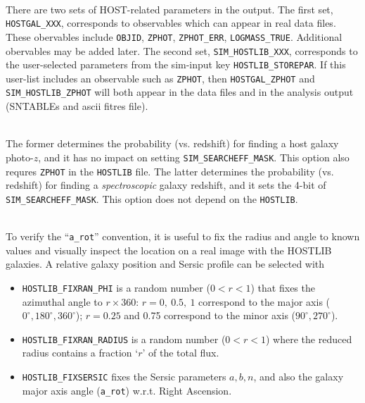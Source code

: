 \documentclass[12pt]{article}
\begin{document}
{%
\bigskip
{} \\
There are two sets of HOST-related parameters in the output.
The first set, {\tt HOSTGAL\_XXX}, corresponds to observables
which can appear in real data files. These obervables include
{\tt OBJID}, {\tt ZPHOT}, {\tt ZPHOT\_ERR}, {\tt LOGMASS\_TRUE}.
Additional obervables may be added later.  The second set,
{\tt SIM\_HOSTLIB\_XXX}, corresponds to the user-selected
parameters from the sim-input key {\tt HOSTLIB\_STOREPAR}.
If this user-list includes an observable such as {\tt ZPHOT},
then {\tt HOSTGAL\_ZPHOT} and {\tt SIM\_HOSTLIB\_ZPHOT} 
will both appear in the data files and in the 
analysis output (SNTABLEs and ascii fitres file).


\bigskip 
{}\\
The former determines the probability (vs. redshift) for finding
a host galaxy photo-$z$, and it has no impact on setting
{\tt SIM\_SEARCHEFF\_MASK}. This option also requres {\tt ZPHOT} 
in the {\tt HOSTLIB} file.
The latter determines the probability (vs. redshift) for finding
a {\it spectroscopic} galaxy redshift, and it sets the 4-bit of
{\tt SIM\_SEARCHEFF\_MASK}. This option does not depend on the
{\tt HOSTLIB}.



\bigskip
{} \\
To verify the ``{\tt a\_rot}'' convention, it is useful to fix the
radius and angle to known values and visually inspect the location
on a real image with the HOSTLIB galaxies. A relative
galaxy position and Sersic profile can be selected with
\begin{itemize}
  \item {\tt HOSTLIB\_FIXRAN\_PHI} is a random number ($0<r<1$) 
        that fixes the azimuthal angle to $r\times 360$:
        $r=0,~0.5,~1$ correspond to the major axis 
        ($0^{\circ},180^{\circ},360^{\circ}$); 
        $r=0.25$ and 0.75 correspond to the minor axis
        ($90^{\circ},270^{\circ}$).
  \item {\tt HOSTLIB\_FIXRAN\_RADIUS} is a random number ($0<r<1$)
         where the reduced radius contains a fraction  
         `$r$' of the total flux.
%
 \item {\tt HOSTLIB\_FIXSERSIC} fixes the Sersic parameters
       $a,b,n$, and also the galaxy major axis angle ({\tt a\_rot})
       w.r.t. Right Ascension.
\end{itemize}


}
\end{document}
